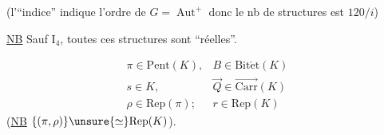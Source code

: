 \diagram{\[\begin{array}{lll}
\uline{\text{niveau }2}&\mathrm I_{10},\mathrm I_6,\mathrm I_4&12+20+30=62\\
\uline{\text{niveau }}1&\mathrm{II}_2,\mathrm{II}'_2,\mathrm{II}_1&60+60+120=240\\
\uline{\text{niveau }}0&\mathrm{III}_2,\mathrm{III}_{\unsure{4|1}},\mathrm{III}'_2&60+120+60=240\\
&&\overline{542}
\end{array}\]}

(l’``indice'' indique l’ordre de \(G=\operatorname{Aut}^{+}\)\unsure{;|,} donc le nb de structures est \(120/i\))

\uline{NB} Sauf \(\mathrm I_4\), toutes ces structures sont ``réelles''.

\[\begin{array}{ll}
\pi\in\mathrm{Pent}(K),&B\in\mathrm{Bit\acute et}(K)\\
s\in K,&\vec Q\in\overrightarrow{\mathrm{Carr}}(K)\\
\rho\in\mathrm{Rep}(\pi);&r\in\mathrm{Rep}(K)
\end{array}\]
(\uline{NB} \(\{(\pi,\rho)\}\unsure{\simeq}\mathrm{Rep}(K)\)).


